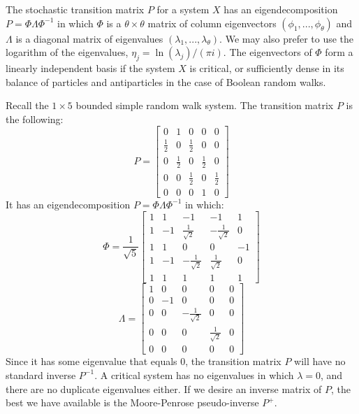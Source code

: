\documentclass[10pt, a5paper, twoside, openright]{memoir}
\begin{document}
The stochastic transition matrix $P$ for a system $X$ has an eigendecomposition $P = \Phi \Lambda \Phi^{-1}$ in which $\Phi$ is a $\theta \times \theta$ matrix of column eigenvectors $(\phi_1,...,\phi_\theta)$ and $\Lambda$ is a diagonal matrix of eigenvalues $(\lambda_1,...,\lambda_\theta)$. We may also prefer to use the logarithm of the eigenvalues, $\eta_j = \ln(\lambda_j)/(\pi i)$. The eigenvectors of $\Phi$ form a linearly independent basis if the system $X$ is critical, or sufficiently dense in its balance of particles and antiparticles in the case of Boolean random walks.

Recall the $1 \times 5$ bounded simple random walk system. The transition matrix $P$ is the following:
$$P = 
\begin{bmatrix}
0 & 1 & 0 & 0 & 0 \\
\frac{1}{2} & 0 & \frac{1}{2} & 0 & 0 \\
0 & \frac{1}{2} & 0 & \frac{1}{2} & 0 \\
0 & 0 & \frac{1}{2} & 0 & \frac{1}{2} \\
0 & 0 & 0 & 1 & 0
\end{bmatrix}
$$
It has an eigendecomposition $P = \Phi \Lambda \Phi^{-1}$ in which:
\[ \Phi = \frac{1}{\sqrt 5}
\begin{bmatrix}
1 & 1 & -1 & -1 & 1 \\
1 & -1 & \frac{1}{\sqrt 2} & -\frac{1}{\sqrt 2} & 0 \\
1 & 1 & 0 & 0 & -1 \\
1 & -1 & -\frac{1}{\sqrt 2} & \frac{1}{\sqrt 2} & 0 \\
1 & 1 & 1 & 1 & 1
\end{bmatrix}\]
\[
\Lambda = \begin{bmatrix}
1 & 0 & 0 & 0 & 0 \\
0 & -1 & 0 & 0 & 0 \\
0 & 0 & -\frac{1}{\sqrt 2} & 0 & 0 \\
0 & 0 & 0 & \frac{1}{\sqrt 2} & 0 \\
0 & 0 & 0 & 0 & 0
\end{bmatrix}
\]
Since it has some eigenvalue that equals $0$, the transition matrix $P$ will have no standard inverse $P^{-1}$. A critical system has no eigenvalues in which $\lambda = 0$, and there are no duplicate eigenvalues either. If we desire an inverse matrix of $P$, the best we have available is the Moore-Penrose pseudo-inverse $P^{+}$.
\end{document}
